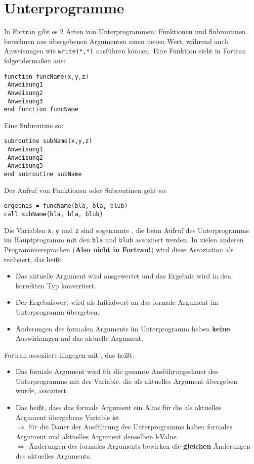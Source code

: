 \section{Unterprogramme}

In Fortran gibt es 2 Arten von Unterprogrammen: Funktionen und Subroutinen.  berechnen aus übergebenen Argumenten einen neuen Wert, während  auch Anweisungen wie \texttt{write(*,*)} ausführen können. Eine Funktion sieht in Fortran folgendermaßen aus:
\begin{lstlisting}
function funcName(x,y,z)
 Anweisung1
 Anweisung2
 Anweisung3
end function funcName
\end{lstlisting}
Eine Subroutine so:
\begin{lstlisting}
subroutine subName(x,y,z)
 Anweisung1
 Anweisung2
 Anweisung3
end subroutine subName
\end{lstlisting}
Der Aufruf von Funktionen oder Subroutinen geht so:
\begin{lstlisting}
ergebnis = funcName(bla, bla, blub)
call subName(bla, bla, blub)
\end{lstlisting}

Die Variablen \texttt{x}, \texttt{y} und \texttt{z} sind sogenannte , die beim Aufruf des Unterprogramms im Hauptprogramm mit den  \texttt{bla} und \texttt{blub} assoziiert werden. In vielen anderen Programmiersprachen (\textbf{Also nicht in Fortran!}) wird diese Assoziation als  realisiert, das heißt
\begin{itemize}
	\item Das aktuelle Argument wird ausgewertet und das Ergebnis wird in den korrekten Typ konvertiert.
	\item Der Ergebniswert wird als Initialwert an das formale Argument im Unterprogramm übergeben.
	\item Änderungen des formalen Arguments im Unterprogramm haben \textbf{keine} Auswirkungen auf das aktuelle Argument.
\end{itemize}
Fortran assoziiert hingegen mit , das heißt:
\begin{itemize}
	\item Das formale Argument wird für die gesamte Ausführungsdauer des Unterprogramms mit der Variable, die als aktuelles Argument übergeben wurde, assoziiert.
	\item Das heißt, dass das formale Argument ein Alias für die als aktuelles Argument übergebene Variable ist \\
	$\Rightarrow$ für die Dauer der Ausführung des Unterprogramms haben formales Argument und aktuelles Argument denselben l-Value \\
	$\Rightarrow$ Änderungen des formales Arguments bewirken die \textbf{gleichen} Änderungen des aktuelles Arguments.
\end{itemize}

